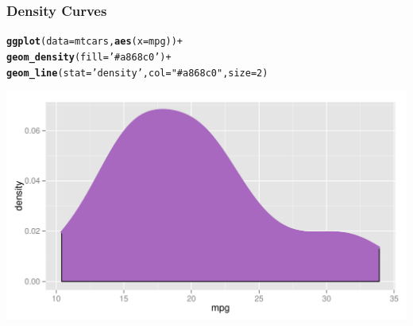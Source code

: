 \documentclass[12pt]{beamer}\usepackage[]{graphicx}\usepackage[]{color}
\makeatletter
\newcommand{\hlnum}[1]{\textcolor[rgb]{0.686,0.059,0.569}{#1}}%
\newcommand{\hlstr}[1]{\textcolor[rgb]{0.192,0.494,0.8}{#1}}%
\newcommand{\hlopt}[1]{\textcolor[rgb]{0,0,0}{#1}}%
\newcommand{\hlstd}[1]{\textcolor[rgb]{0.345,0.345,0.345}{#1}}%
\newcommand{\hlkwc}[1]{\textcolor[rgb]{0.333,0.667,0.333}{#1}}%
\newcommand{\hlkwd}[1]{\textcolor[rgb]{0.737,0.353,0.396}{\textbf{#1}}}%
\newenvironment{kframe}{%
 \def\at@end@of@kframe{}%
 \ifinner\ifhmode%
  \def\at@end@of@kframe{\end{minipage}}%
  \begin{minipage}{\columnwidth}%
 \fi\fi%
 \def\FrameCommand##1{\hskip\@totalleftmargin \hskip-\fboxsep
 \colorbox{shadecolor}{##1}\hskip-\fboxsep
     \hskip-\linewidth \hskip-\@totalleftmargin \hskip\columnwidth}%
 \MakeFramed {\advance\hsize-\width
   \@totalleftmargin\z@ \linewidth\hsize
   \@setminipage}}%
 {\par\unskip\endMakeFramed%
 \at@end@of@kframe}
\newenvironment{knitrout}{}{} %
\makeatother
\begin{document}
\begin{frame}[fragile]
\frametitle{Density Curves}

\begin{knitrout}\scriptsize
{}\color{fgcolor}\begin{kframe}
\begin{alltt}
\hlkwd{ggplot}\hlstd{(}\hlkwc{data} \hlstd{= mtcars,} \hlkwd{aes}\hlstd{(}\hlkwc{x} \hlstd{= mpg))} \hlopt{+}
  \hlkwd{geom_density}\hlstd{(}\hlkwc{fill} \hlstd{=} \hlstr{'#a868c0'}\hlstd{)} \hlopt{+}
  \hlkwd{geom_line}\hlstd{(}\hlkwc{stat} \hlstd{=} \hlstr{'density'}\hlstd{,} \hlkwc{col} \hlstd{=} \hlstr{"#a868c0"}\hlstd{,} \hlkwc{size} \hlstd{=} \hlnum{2}\hlstd{)}
\end{alltt}
\end{kframe}

{\centering \includegraphics[width=.9\linewidth,height=.5\linewidth]{figure/unnamed-chunk-12-1} 

}



\end{knitrout}

\end{frame}


\begin{frame}
\begin{center}
\Huge{}
\end{center}
\end{frame}

\end{document}
